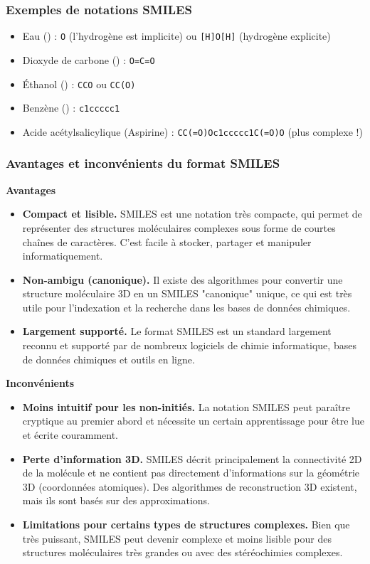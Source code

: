 \documentclass[12pt,a4paper]{article} %
\numberwithin{equation}{section} %
\numberwithin{figure}{section} %
\numberwithin{table}{section} %
\begin{document}
\subsubsection{Exemples de notations SMILES}

\begin{itemize}
 \item Eau () : \texttt{O} (l'hydrogène est implicite) ou \texttt{[H]O[H]} (hydrogène explicite)
 \item Dioxyde de carbone () : \texttt{O=C=O}
 \item Éthanol () : \texttt{CCO} ou \texttt{CC(O)}
 \item Benzène () : \texttt{c1ccccc1}
 \item Acide acétylsalicylique (Aspirine) : \texttt{CC(=O)Oc1ccccc1C(=O)O} (plus complexe !)
\end{itemize}

\subsubsection{Avantages et inconvénients du format SMILES}

\textbf{Avantages}

\begin{itemize}
 \item \textbf{Compact et lisible.} SMILES est une notation très compacte, qui permet de représenter des structures moléculaires complexes sous forme de courtes chaînes de caractères. C'est facile à stocker, partager et manipuler informatiquement.
 \item \textbf{Non-ambigu (canonique).} Il existe des algorithmes pour convertir une structure moléculaire 3D en un SMILES "canonique" unique, ce qui est très utile pour l'indexation et la recherche dans les bases de données chimiques.
 \item \textbf{Largement supporté.} Le format SMILES est un standard largement reconnu et supporté par de nombreux logiciels de chimie informatique, bases de données chimiques et outils en ligne.
\end{itemize}

\textbf{Inconvénients}

\begin{itemize}
 \item \textbf{Moins intuitif pour les non-initiés.} La notation SMILES peut paraître cryptique au premier abord et nécessite un certain apprentissage pour être lue et écrite couramment.
 \item \textbf{Perte d'information 3D.} SMILES décrit principalement la connectivité 2D de la molécule et ne contient pas directement d'informations sur la géométrie 3D (coordonnées atomiques). Des algorithmes de reconstruction 3D existent, mais ils sont basés sur des approximations.
 \item \textbf{Limitations pour certains types de structures complexes.} Bien que très puissant, SMILES peut devenir complexe et moins lisible pour des structures moléculaires très grandes ou avec des stéréochimies complexes.
\end{itemize}
\end{document}
